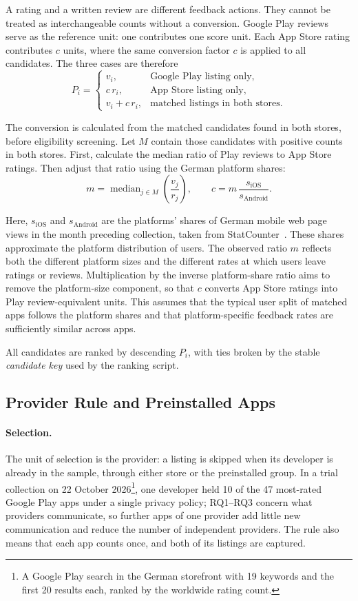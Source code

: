 A rating and a written review are different feedback actions. They cannot be
treated as interchangeable counts without a conversion. Google Play reviews
serve as the reference unit: one contributes one score unit. Each App Store
rating contributes $c$ units, where the same conversion factor $c$ is applied
to all candidates. The three cases are therefore
\[
  P_i =
  \begin{cases}
    v_i, & \text{Google Play listing only},\\
    c\,r_i, & \text{App Store listing only},\\
    v_i+c\,r_i, & \text{matched listings in both stores}.
  \end{cases}
\]

The conversion is calculated from the matched candidates found in both stores,
before eligibility screening. Let $M$ contain those candidates with positive
counts in both stores. First, calculate the median ratio of Play reviews to
App Store ratings. Then adjust that ratio using the German platform shares:
\[
  m = \operatorname{median}_{j\in M}\!\left(\frac{v_j}{r_j}\right),
  \qquad
  c = m\,\frac{s_{\mathrm{iOS}}}{s_{\mathrm{Android}}}.
\]

Here, $s_{\mathrm{iOS}}$ and $s_{\mathrm{Android}}$ are the platforms' shares of
German mobile web page views in the month preceding collection, taken from
StatCounter~\parencite{statcounter2026os}. These shares approximate the
platform distribution of users. The observed ratio $m$ reflects both the
different platform sizes and the different rates at which users leave ratings
or reviews. Multiplication by the inverse platform-share ratio aims to remove
the platform-size component, so that $c$ converts App Store ratings into Play
review-equivalent units. This assumes that the typical user split of matched
apps follows the platform shares and that platform-specific feedback rates
are sufficiently similar across apps.

All candidates are ranked by descending $P_i$, with ties broken by the stable
\emph{candidate key} used by the ranking script.

\subsection{Provider Rule and Preinstalled Apps}
\label{sec:selection}
\paragraph{Selection.} The unit of selection is the provider: a listing is skipped when its
developer is already in the sample, through either store or the preinstalled group. In a
trial collection on 22 October 2026\footnote{A Google Play search in the German storefront
with 19 keywords and the first 20 results each, ranked by the worldwide rating count.}, one
developer held 10 of the 47 most-rated Google Play apps under a single privacy policy;
RQ1--RQ3 concern what providers communicate, so further apps of one provider add little new
communication and reduce the number of independent providers. The rule also means that each app
counts once, and both of its listings are captured.

